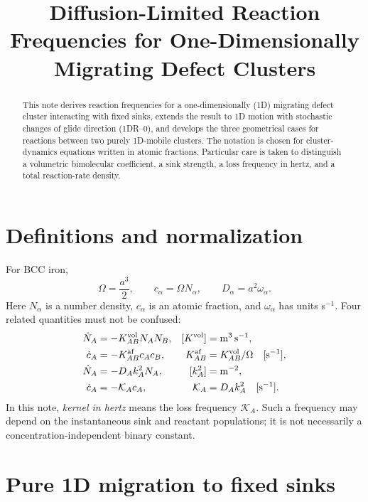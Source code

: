 \documentclass[11pt]{article}
\title{Diffusion-Limited Reaction Frequencies for One-Dimensionally Migrating Defect Clusters}
\author{}
\date{}
\newcommand{\KK}{\mathcal{K}}
\begin{document}
\maketitle
\begin{abstract}
This note derives reaction frequencies for a one-dimensionally (1D) migrating
defect cluster interacting with fixed sinks, extends the result to 1D motion
with stochastic changes of glide direction (1DR--0), and develops the three
geometrical cases for reactions between two purely 1D-mobile clusters. The
notation is chosen for cluster-dynamics equations written in atomic fractions.
Particular care is taken to distinguish a volumetric bimolecular coefficient,
a sink strength, a loss frequency in hertz, and a total reaction-rate density.
\end{abstract}

\section{Definitions and normalization}
For BCC iron,
\begin{equation}
 \Omega=\frac{a^3}{2},\qquad c_\alpha=\Omega N_\alpha,\qquad
 D_\alpha=a^2\omega_\alpha .
\end{equation}
Here \(N_\alpha\) is a number density, \(c_\alpha\) is an atomic fraction, and
\(\omega_\alpha\) has units s\(^{-1}\). Four related quantities must not be
confused:
\begin{align}
 \dot N_A&=-K^{\rm vol}_{AB}N_AN_B,
 &[K^{\rm vol}]&={\rm m^3\,s^{-1}},\\
 \dot c_A&=-K^{\rm af}_{AB}c_Ac_B,
 &K^{\rm af}_{AB}&=K^{\rm vol}_{AB}/\Omega\quad [{\rm s^{-1}}],\\
 \dot N_A&=-D_A k_A^2N_A,
 &[k_A^2]&={\rm m^{-2}},\\
 \dot c_A&=-\KK_Ac_A,
 &\KK_A&=D_Ak_A^2\quad [{\rm s^{-1}}].
 \label{eq:definitions}
\end{align}
In this note, \emph{kernel in hertz} means the loss frequency \(\KK_A\).
Such a frequency may depend on the instantaneous sink and reactant
populations; it is not necessarily a concentration-independent binary
constant.

\section{Pure 1D migration to fixed sinks}
\end{document}

